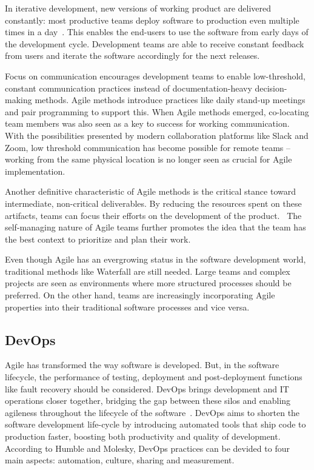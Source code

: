 In iterative development, new versions of working product are delivered constantly: most productive teams deploy software to production even multiple times in a day~\cite{forsgren_accelerate_2018}. This enables the end-users to use the software from early days of the development cycle. Development teams are able to receive constant feedback from users and iterate the software accordingly for the next releases.~\cite{balaji_waterfall_2012}

Focus on communication encourages development teams to enable low-threshold, constant communication practices instead of documentation-heavy decision-making methods. Agile methods introduce practices like daily stand-up meetings and pair programming to support this. When Agile methods emerged, co-locating team members was also seen as a key to success for working communication. With the possibilities presented by modern collaboration platforms like Slack and Zoom, low threshold communication has become possible for remote teams – working from the same physical location is no longer seen as crucial for Agile implementation.

Another definitive characteristic of Agile methods is the critical stance toward intermediate, non-critical deliverables. By reducing the resources spent on these artifacts, teams can focus their efforts on the development of the product.~\cite{cohen_introduction_2004} The self-managing nature of Agile teams further promotes the idea that the team has the best context to prioritize and plan their work.~\cite{alshamrani_comparison_2015} 

Even though Agile has an evergrowing status in the software development world, traditional methods like Waterfall are still needed. Large teams and complex projects are seen as environments where more structured processes should be preferred. On the other hand, teams are increasingly incorporating Agile properties into their traditional software processes and vice versa.~\cite{cohen_introduction_2004} 

\subsection{DevOps}

Agile has transformed the way software is developed. But, in the software lifecycle, the performance of testing, deployment and post-deployment functions like fault recovery should be considered. DevOps brings development and IT operations closer together, bridging the gap between these silos and enabling agileness throughout the lifecycle of the software~\cite{hemon-hildgen_agile_2020}. DevOps aims to shorten the software development life-cycle by introducing automated tools that ship code to production faster, boosting both productivity and quality of development\cite{cois_modern_2014}. According to Humble and Molesky, DevOps practices can be devided to four main aspects: automation, culture, sharing and measurement\cite{humble_why_2011}. 


